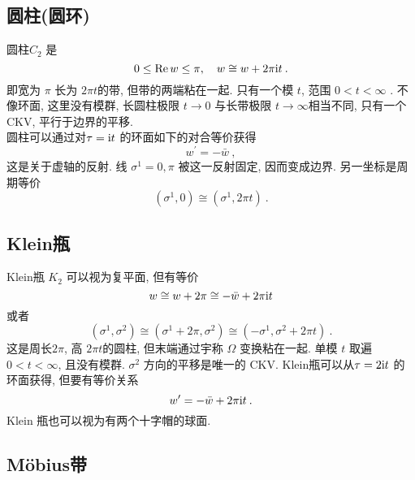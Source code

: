 \subsection*{圆柱(圆环)}

圆柱$C_{2}$ 是
\begin{equation}
	0 \leq \operatorname{Re} w \leq \pi, \quad w \cong w+2 \pi \mathrm{i} t \:. \label{7.1.5}
\end{equation}
即宽为 $\pi$ 长为 $2 \pi t$的带, 但带的两端粘在一起. 只有一个模 $t$, 范围 $0<t<\infty $ . 不像环面, 这里没有模群, 长圆柱极限 $t \rightarrow 0$ 与长带极限 $t \rightarrow \infty$相当不同, 只有一个CKV, 平行于边界的平移. \\

圆柱可以通过对$\tau=\mathrm{i} t$ 的环面如下的对合等价获得
\begin{equation}
	w^{\prime}=-\bar{w} \:, \label{7.1.6}
\end{equation}
这是关于虚轴的反射. 线 $\sigma^{1}=0, \pi$ 被这一反射固定, 因而变成边界. 另一坐标是周期等价
\begin{equation}
  (\sigma^{1}, 0) \cong(\sigma^{1}, 2 \pi t) \:. \label{7.1.7}
\end{equation}


\subsection*{Klein瓶}

Klein瓶 $K_{2}$ 可以视为复平面, 但有等价
\begin{equation}
	w \cong w+2 \pi \cong-\bar{w}+2 \pi \mathrm{i} t \label{7.1.8}
\end{equation}
或者
\begin{equation}
	(\sigma^{1}, \sigma^{2}) \cong (\sigma^{1}+2 \pi, \sigma^{2}) \cong (-\sigma^{1}, \sigma^{2}+2 \pi t) \:. \label{7.1.9}
\end{equation}
这是周长$2 \pi$, 高 $2 \pi t$的圆柱, 但末端通过宇称 $\Omega$ 变换粘在一起.  单模 $t$ 取遍 $0<t<\infty$, 且没有模群. 
$\sigma^{2}$ 方向的平移是唯一的 CKV. Klein瓶可以从$\tau=2 \mathrm{i} t$ 的环面获得, 但要有等价关系
\begin{equation}
	w^{\prime}=-\bar{w}+2 \pi \mathrm{i} t \:. \label{7.1.10}
\end{equation}
Klein 瓶也可以视为有两个十字帽的球面.

\subsection*{M\"{o}bius带}

